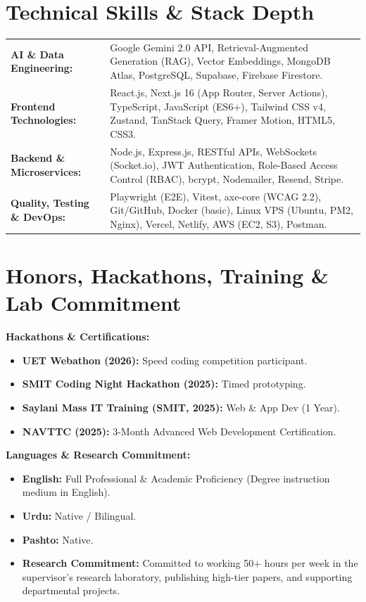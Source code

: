 \documentclass[10pt,a4paper]{article}
\begin{document}
\section{Technical Skills \& Stack Depth}
\begin{tabularx}{\textwidth}{@{}l X@{}}
    \textbf{AI \& Data Engineering:} & Google Gemini 2.0 API, Retrieval-Augmented Generation (RAG), Vector Embeddings, MongoDB Atlas, PostgreSQL, Supabase, Firebase Firestore. \\
    \textbf{Frontend Technologies:} & React.js, Next.js 16 (App Router, Server Actions), TypeScript, JavaScript (ES6+), Tailwind CSS v4, Zustand, TanStack Query, Framer Motion, HTML5, CSS3. \\
    \textbf{Backend \& Microservices:} & Node.js, Express.js, RESTful APIs, WebSockets (Socket.io), JWT Authentication, Role-Based Access Control (RBAC), bcrypt, Nodemailer, Resend, Stripe. \\
    \textbf{Quality, Testing \& DevOps:} & Playwright (E2E), Vitest, axe-core (WCAG 2.2), Git/GitHub, Docker (basic), Linux VPS (Ubuntu, PM2, Nginx), Vercel, Netlify, AWS (EC2, S3), Postman.
\end{tabularx}

\section{Honors, Hackathons, Training \& Lab Commitment}
\begin{minipage}[t]{0.48\textwidth}
    \textbf{Hackathons \& Certifications:}
    \begin{itemize}
        \item \textbf{UET Webathon (2026):} Speed coding competition participant.
        \item \textbf{SMIT Coding Night Hackathon (2025):} Timed prototyping.
        \item \textbf{Saylani Mass IT Training (SMIT, 2025):} Web \& App Dev (1 Year).
        \item \textbf{NAVTTC (2025):} 3-Month Advanced Web Development Certification.
    \end{itemize}
\end{minipage}
\hfill
\begin{minipage}[t]{0.48\textwidth}
    \textbf{Languages \& Research Commitment:}
    \begin{itemize}
        \item \textbf{English:} Full Professional \& Academic Proficiency (Degree instruction medium in English).
        \item \textbf{Urdu:} Native / Bilingual.
        \item \textbf{Pashto:} Native.
        \item \textbf{Research Commitment:} Committed to working 50+ hours per week in the supervisor’s research laboratory, publishing high-tier papers, and supporting departmental projects.
    \end{itemize}
\end{minipage}
\end{document}
